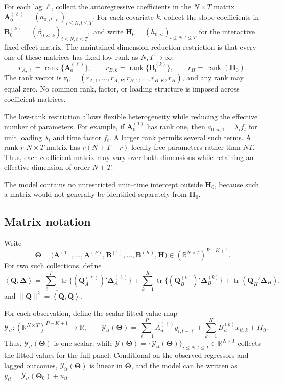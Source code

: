 \documentclass[11pt]{article}
\numberwithin{equation}{section}
\theoremstyle{remark}
\newcommand{\R}{\mathbb R}
\newcommand{\rank}{\operatorname{rank}}
\newcommand{\ip}[2]{\left\langle #1,#2\right\rangle}
\newcommand{\br}{\bm r}
\newcommand{\bA}{\bm A}
\newcommand{\bB}{\bm B}
\newcommand{\bH}{\bm H}
\newcommand{\bQ}{\bm Q}
\newcommand{\bDelta}{\bm\Delta}
\newcommand{\bTheta}{\bm\Theta}
\begin{document}
For each lag $\ell$, collect the autoregressive coefficients in the $N\times T$ matrix
$
\bA_0^{(\ell)}=(a_{0,it,\ell})_{i\le N,t\le T}.
$
For each covariate $k$, collect the slope coefficients in
$
\bB_0^{(k)}=(\beta_{0,it,k})_{i\le N,t\le T},
$
and write $\bH_0=(h_{0,it})_{i\le N,t\le T}$ for the interactive fixed-effect matrix. The maintained dimension-reduction restriction is that every one of these matrices has fixed low rank as $N,T\to\infty$:
$$
r_{A,\ell}=\rank\{\bA_0^{(\ell)}\},
\qquad
r_{B,k}=\rank\{\bB_0^{(k)}\},
\qquad
r_H=\rank(\bH_0).
$$
The rank vector is $\br_0=(r_{A,1},\ldots,r_{A,P},r_{B,1},\ldots,r_{B,K},r_H)$, and any rank may equal zero. No common rank, factor, or loading structure is imposed across coefficient matrices.

The low-rank restriction allows flexible heterogeneity while reducing the effective number of parameters. For example, if $\bA_0^{(1)}$ has rank one, then $a_{0,it,1}=\lambda_i f_t$ for unit loading $\lambda_i$ and time factor $f_t$. A larger rank permits several such terms. A rank-$r$ $N\times T$ matrix has $r(N+T-r)$ locally free parameters rather than $NT$. Thus, each coefficient matrix may vary over both dimensions while retaining an effective dimension of order $N+T$.

The model contains no unrestricted unit--time intercept outside $\bH_0$, because such a matrix would not generally be identified separately from $\bH_0$.

\subsection{Matrix notation}

Write
$$
\bTheta
=
\bigl(
\bA^{(1)},\ldots,\bA^{(P)},
\bB^{(1)},\ldots,\bB^{(K)},
\bH
\bigr)
\in
\left(\R^{N\times T}\right)^{P+K+1}.
$$
For two such collections, define
$$
\ip{\bQ}{\bDelta}
=
\sum_{\ell=1}^{P}\operatorname{tr}\{(\bQ_A^{(\ell)})'\bDelta_A^{(\ell)}\}
+
\sum_{k=1}^{K}\operatorname{tr}\{(\bQ_B^{(k)})'\bDelta_B^{(k)}\}
+
\operatorname{tr}(\bQ_H'\bDelta_H),
$$
and $\|\bQ\|^2=\ip{\bQ}{\bQ}$.

For each observation, define the scalar fitted-value map
\begin{equation}
\label{eq:fitted_value}
\mathcal Y_{it}:
\left(\R^{N\times T}\right)^{P+K+1}
\longrightarrow
\R,
\qquad
\mathcal Y_{it}(\bTheta)
=
\sum_{\ell=1}^{P}A_{it}^{(\ell)}y_{i,t-\ell}
+
\sum_{k=1}^{K}B_{it}^{(k)}x_{it,k}
+
H_{it}.
\end{equation}
Thus, $\mathcal Y_{it}(\bTheta)$ is one scalar, while
$
\mathcal Y(\bTheta)
=
\{\mathcal Y_{it}(\bTheta)\}_{i\le N,t\le T}
\in\R^{N\times T}
$
collects the fitted values for the full panel. Conditional on the observed regressors and lagged outcomes, $\mathcal Y_{it}(\bTheta)$ is linear in $\bTheta$, and the model can be written as $y_{it}=\mathcal Y_{it}(\bTheta_0)+u_{it}$.
\end{document}
